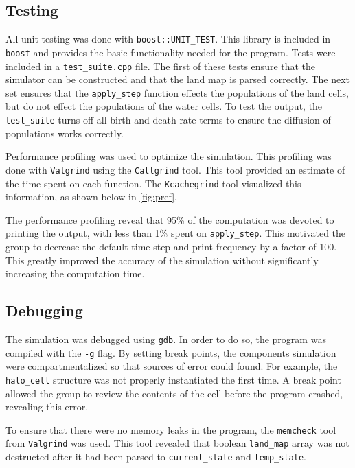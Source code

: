 \documentclass[a4paper,11pt]{article}
\begin{document}
\subsection{Testing}\label{test}

All unit testing was done with \texttt{boost::UNIT\_TEST}.  This library is included in \texttt{boost} and provides the basic functionality needed for the program.  Tests were included in a \texttt{test\_suite.cpp} file.  The first of these tests ensure that the simulator can be constructed and that the land map is parsed correctly.  The next set ensures that the \texttt{apply\_step} function effects the populations of the land cells, but do not effect the populations of the water cells.  To test the output, the \texttt{test\_suite} turns off all birth and death rate terms to ensure the diffusion of populations works correctly.   

Performance profiling was used to optimize the simulation.  This profiling was done with \texttt{Valgrind} using the \texttt{Callgrind} tool.  This tool provided an estimate of the time spent on each function.  The \texttt{Kcachegrind} tool visualized this information, as shown below in \ref{fig:pref}.


The performance profiling reveal that 95\% of the computation was devoted to printing the output, with less than 1\% spent on \texttt{apply\_step}.  This motivated the group to decrease the default time step and print frequency by a factor of 100.  This greatly improved the accuracy of the simulation without significantly increasing the computation time.  

\subsection{Debugging}

The simulation was debugged using \texttt{gdb}.  In order to do so, the program was compiled with the \texttt{-g} flag.  By setting break points, the components simulation were compartmentalized so that sources of error could found.  For example, the \texttt{halo\_cell} structure was not properly instantiated the first time.  A break point allowed the group to review the contents of the cell before the program crashed, revealing this error.   

To ensure that there were no memory leaks in the program, the \texttt{memcheck} tool from \texttt{Valgrind} was used.  This tool revealed that boolean \texttt{land\_map} array was not destructed after it had been parsed to \texttt{current\_state} and \texttt{temp\_state}.  
 
\end{document}
